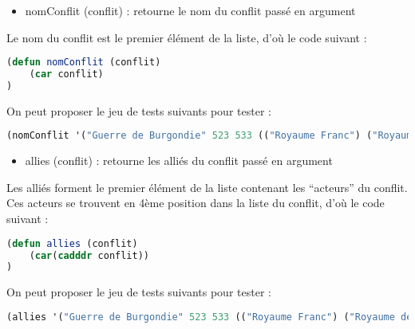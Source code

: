 \documentclass[a4paper, 12pt]{article}
\begin{document}
\vspace{5mm}
\begin{itemize}[label=\textbullet]
\item nomConflit (conflit) : retourne le nom du conflit passé en argument
\end{itemize}
\vspace{3mm}

Le nom du conflit est le premier élément de la liste, d’où le code suivant :
\vspace{2mm}

\begin{lstlisting}[language=Lisp]
(defun nomConflit (conflit)
    (car conflit)
)
\end{lstlisting}
\vspace{2mm}

On peut proposer le jeu de tests suivants pour tester :
\vspace{2mm}

\begin{lstlisting}[language=Lisp]
(nomConflit '("Guerre de Burgondie" 523 533 (("Royaume Franc") ("Royaume des Burgondes")) ("Vezeronce" "Arles"))) ; renvoie "Guerre de Burgondie"
\end{lstlisting}
\vspace{5mm}

\begin{itemize}[label=\textbullet]
\item allies (conflit) : retourne les alliés du conflit passé en argument
\end{itemize}
\vspace{3mm}

Les alliés forment le premier élément de la liste contenant les “acteurs” du conflit. Ces acteurs se trouvent en 4ème position dans la liste du conflit, d’où le code suivant :
\vspace{2mm}

\begin{lstlisting}[language=Lisp]
(defun allies (conflit)
    (car(cadddr conflit))
)
\end{lstlisting}
\vspace{2mm}

On peut proposer le jeu de tests suivants pour tester :
\begin{lstlisting}[language=Lisp]
(allies '("Guerre de Burgondie" 523 533 (("Royaume Franc") ("Royaume des Burgondes")) ("Vezeronce" "Arles"))) ; renvoie ("Royaume Franc")
\end{lstlisting}
\vspace{5mm}
\end{document}
